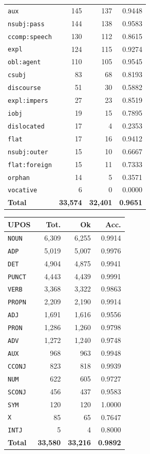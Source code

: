 \begin{table}[ht]
\begin{minipage}[t]{0.55\linewidth}
\begin{tabular}{lrrr}
\texttt{aux} & 145 & 137 & 0.9448 \\
\texttt{nsubj\!:\!pass} & 144 & 138 & 0.9583 \\
\texttt{ccomp\!:\!speech} & 130 & 112 & 0.8615 \\
\texttt{expl} & 124 & 115 & 0.9274 \\
\texttt{obl\!:\!agent} & 110 & 105 & 0.9545 \\
\texttt{csubj} & 83 & 68 & 0.8193 \\
\texttt{discourse} & 51 & 30 & 0.5882 \\
\texttt{expl\!:\!impers} & 27 & 23 & 0.8519 \\
\texttt{iobj} & 19 & 15 & 0.7895 \\
\texttt{dislocated} & 17 & 4 & 0.2353 \\
\texttt{flat} & 17 & 16 & 0.9412 \\
\texttt{nsubj\!:\!outer} & 15 & 10 & 0.6667 \\
\texttt{flat\!:\!foreign} & 15 & 11 & 0.7333 \\
\texttt{orphan} & 14 & 5 & 0.3571 \\
\texttt{vocative} & 6 & 0 & 0.0000 \\
\midrule
\textbf{Total} & \textbf{33,574} & \textbf{32,401} & \textbf{0.9651} \\
\bottomrule
\end{tabular}
\end{minipage}
\hfill
\begin{minipage}[t]{0.42\linewidth}
\centering\scriptsize
\begin{tabular}{lrrr}
\toprule
\textbf{UPOS} & \textbf{Tot.} & \textbf{Ok} & \textbf{Acc.} \\
\midrule
\texttt{NOUN} & 6,309 & 6,255 & 0.9914 \\
\texttt{ADP} & 5,019 & 5,007 & 0.9976 \\
\texttt{DET} & 4,904 & 4,875 & 0.9941 \\
\texttt{PUNCT} & 4,443 & 4,439 & 0.9991 \\
\texttt{VERB} & 3,368 & 3,322 & 0.9863 \\
\texttt{PROPN} & 2,209 & 2,190 & 0.9914 \\
\texttt{ADJ} & 1,691 & 1,616 & 0.9556 \\
\texttt{PRON} & 1,286 & 1,260 & 0.9798 \\
\texttt{ADV} & 1,272 & 1,240 & 0.9748 \\
\texttt{AUX} & 968 & 963 & 0.9948 \\
\texttt{CCONJ} & 823 & 818 & 0.9939 \\
\texttt{NUM} & 622 & 605 & 0.9727 \\
\texttt{SCONJ} & 456 & 437 & 0.9583 \\
\texttt{SYM} & 120 & 120 & 1.0000 \\
\texttt{X} & 85 & 65 & 0.7647 \\
\texttt{INTJ} & 5 & 4 & 0.8000 \\
\midrule
\textbf{Total} & \textbf{33,580} & \textbf{33,216} & \textbf{0.9892} \\
\bottomrule
\end{tabular}
\end{minipage}
\end{table}
